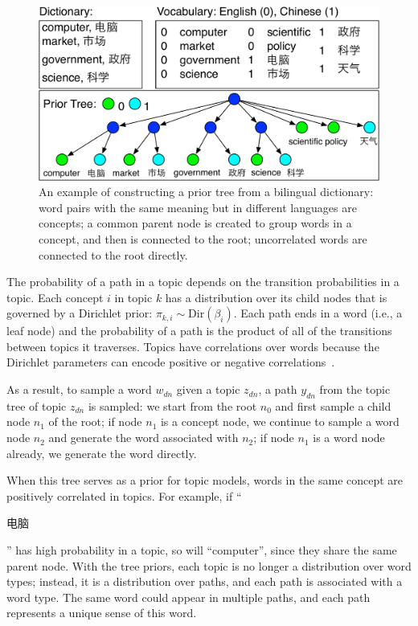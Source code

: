 \begin{figure}
\centering
\includegraphics[width=0.9\linewidth]{figures/correlations_tree-crop.pdf}
\vspace{-3mm}
\caption[Constructing prior tree from a bilingual dictionary]{An example of constructing a prior tree from a
  bilingual dictionary: word pairs with the same meaning but in
  different languages are concepts; a common parent node is created to
  group words in a concept, and then is connected to the root;
  uncorrelated words are connected to the root directly.}
\label{fig:prior_trees}
\end{figure}

The probability of a path in a topic depends on the transition
probabilities in a topic.  Each concept $i$ in topic $k$ has a
distribution over its child nodes that is governed by a Dirichlet prior:
$\pi_{k,i} \sim \text{Dir}(\beta_{i})$.  Each path ends in a word
(i.e., a leaf node) and the probability of a path is the product of
all of the transitions between topics it traverses. Topics have
correlations over words because the Dirichlet parameters can encode
positive or negative correlations~\citep{andrzejewski-09}.

As a result, to sample a word $w_{dn}$ given a topic $z_{dn}$, a path
$y_{dn}$ from the topic tree of topic $z_{dn}$ is sampled: we start
from the root $n_0$ and first sample a child node $n_1$ of the root;
if node $n_1$ is a concept node, we continue to sample a word node
$n_2$ and generate the word associated with $n_2$; if node $n_1$ is a
word node already, we generate the word directly.


When this tree serves as a prior for topic models, words in the same
concept are positively correlated in topics.  For example, if
``\begin{CJK*}{UTF8}{gbsn}电脑\end{CJK*}'' has high probability in a
  topic, so will ``computer'', since they share the same parent
  node. With the tree priors, each topic is no longer a distribution
  over word types; instead, it is a distribution over paths, and each
  path is associated with a word type.  The same word could appear in
  multiple paths, and each path represents a unique sense of this
  word.



